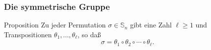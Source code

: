 \documentclass{beamer}
\renewcommand\SS{\mathbb S}
\newcommand{\ue}{\"u}
\begin{document}
\begin{frame}\frametitle{Die symmetrische Gruppe}
	\begin{block}{Proposition}
		Zu jeder Permutation $\sigma\in\SS_n$ gibt eine Zahl $\ell\geq1$ und Transpositionen $\theta_1,\ldots,\theta_\ell$, so da\ss\ $$ \sigma=\theta_1\circ\theta_2\circ\cdots\circ\theta_\ell.  $$
	\end{block}
\end{frame}
\end{document}
